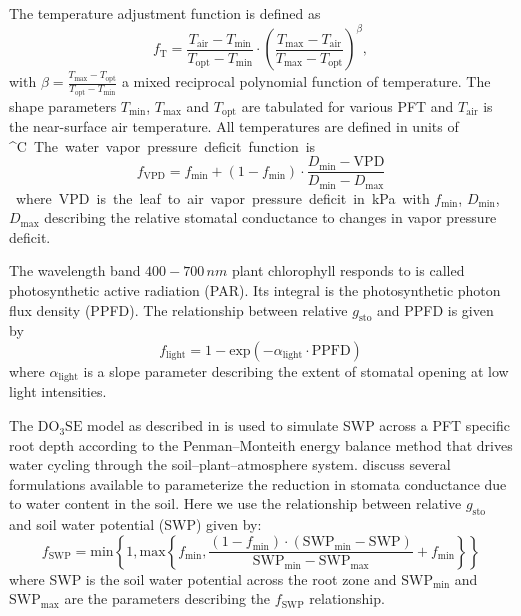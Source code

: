 \documentclass[bg, manuscript]{copernicus}
\begin{document}
The temperature adjustment function is defined as
%
\begin{equation}
  f_\mathrm{T} = \frac{T_\text{air}-T_\text{min}}{T_\text{opt}-T_\text{min}} \cdot \left(\frac{T_{\text{max}}-T_\text{air}}{T_{\text{max}}-T_\text{opt}}\right)^\beta,
  \label{eq:f_temp}
\end{equation}
with $\beta = \frac{T_\text{max}-T_\text{opt}}{T_\text{opt}-T_\text{min}}$ a mixed reciprocal polynomial function of temperature. The shape parameters $T_\text{min}$, $T_\text{max}$ and $T_\text{opt}$ are tabulated for various PFT and $T_\mathrm{air}$ is the near-surface air temperature. All temperatures are defined in units of \unit{^\circ C}.

The water vapor pressure deficit function is
%
\begin{equation}
  f_\mathrm{VPD} = f_\text{min}+(1-f_\text{min}) \cdot \frac{D_\text{min} - \text{VPD}}{D_\text{min}-D_\text{max}}
  \label{eq:f_vpd}
\end{equation}
%
where VPD is the leaf to air vapor pressure deficit in \unit{kPa} with $f_\text{min}$, $D_\text{min}$, $D_\text{max}$ describing the relative stomatal conductance to changes in vapor pressure deficit.

The wavelength band $400-700\,\unit{nm}$ plant chlorophyll responds to is called photosynthetic active radiation (PAR). Its integral is the photosynthetic photon flux density (PPFD). The relationship between relative $g_\mathrm{sto}$ and PPFD is given by
%
\begin{equation}
  f_\text{light} = 1-\text{exp}(-\alpha_\text{light}\cdot \text{PPFD})
  \label{eq:flight}
\end{equation}
%
where $\alpha_\mathrm{light}$ is a slope parameter describing the extent of stomatal opening at low light intensities.

The $\mathrm{DO_3SE}$ model as described in \citet{ACP:Bueker2012} is used to simulate SWP across a PFT specific root depth according to the Penman--Monteith energy balance method that drives water cycling through the soil--plant--atmosphere system. \citet{ACP:Bueker2012} discuss several formulations available to parameterize the reduction in stomata conductance due to water content in the soil. Here we use the relationship between relative $g_\mathrm{sto}$ and soil water potential (SWP) given by:
%
\begin{equation}
  f_\mathrm{SWP} = \text{min}\left\{1, \text{max}\left\{f_\mathrm{min}, \frac{(1 - f_\mathrm{min})\cdot(\mathrm{SWP_{min}} - \mathrm{SWP})}{\mathrm{SWP_{min}} - \mathrm{SWP_{max}}} + f_\mathrm{min} \right\} \right\}
    \label{eq:fsw}
\end{equation}
%
where SWP is the soil water potential across the root zone and $\mathrm{SWP_{min}}$ and $\mathrm{SWP_{max}}$ are the parameters describing the $f_\mathrm{SWP}$ relationship.
\end{document}
